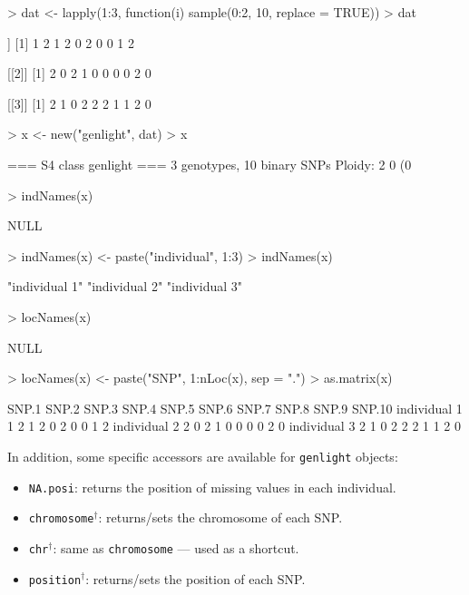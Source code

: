 \documentclass{article}
\begin{document}
\begin{Schunk}
\begin{Sinput}
> dat <- lapply(1:3, function(i) sample(0:2, 10, replace = TRUE))
> dat
\end{Sinput}
\begin{Soutput}
[[1]]
 [1] 1 2 1 2 0 2 0 0 1 2

[[2]]
 [1] 2 0 2 1 0 0 0 0 2 0

[[3]]
 [1] 2 1 0 2 2 2 1 1 2 0
\end{Soutput}
\begin{Sinput}
> x <- new("genlight", dat)
> x
\end{Sinput}
\begin{Soutput}
 === S4 class genlight ===
 3 genotypes,  10 binary SNPs
 Ploidy: 2
 0 (0 %) missing data
\end{Soutput}
\begin{Sinput}
> indNames(x)
\end{Sinput}
\begin{Soutput}
NULL
\end{Soutput}
\begin{Sinput}
> indNames(x) <- paste("individual", 1:3)
> indNames(x)
\end{Sinput}
\begin{Soutput}
[1] "individual 1" "individual 2" "individual 3"
\end{Soutput}
\begin{Sinput}
> locNames(x)
\end{Sinput}
\begin{Soutput}
NULL
\end{Soutput}
\begin{Sinput}
> locNames(x) <- paste("SNP", 1:nLoc(x), sep = ".")
> as.matrix(x)
\end{Sinput}
\begin{Soutput}
             SNP.1 SNP.2 SNP.3 SNP.4 SNP.5 SNP.6 SNP.7 SNP.8 SNP.9 SNP.10
individual 1     1     2     1     2     0     2     0     0     1      2
individual 2     2     0     2     1     0     0     0     0     2      0
individual 3     2     1     0     2     2     2     1     1     2      0
\end{Soutput}
\end{Schunk}

\noindent
In addition, some specific accessors are available for \texttt{genlight} objects:
\begin{itemize}
  \item \texttt{NA.posi}: returns the position of missing values in each individual.
  \item \texttt{chromosome}$^{\dagger}$: returns/sets the chromosome of each SNP.
  \item \texttt{chr}$^{\dagger}$: same as \texttt{chromosome} --- used as a shortcut.
  \item \texttt{position}$^{\dagger}$: returns/sets the position of each SNP.
\end{itemize}
\end{document}
